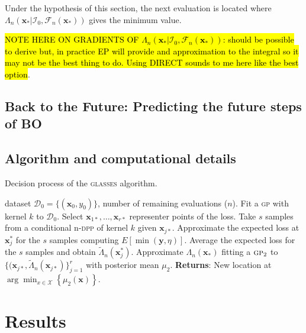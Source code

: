\documentclass[twoside]{article}
\newcommand{\I}{\mathcal{I}}
\newcommand{\bx}{\textbf{x}}
\newcommand{\by}{\textbf{y}}
\newcommand{\future}{\mathcal{F}}
\newcommand{\acr}[1]{\textsc{#1}\xspace}
\newcommand{\gp}{\acr{gp}}
\newcommand{\dpp}{\acr{dpp}}
\newcommand{\us}{\acr{glasses}}
\begin{document}
Under the hypothesis of this section, the next evaluation is located where $\Lambda_n(\bx_*|\I_0, \future_{n}(\bx_*) )$ gives the minimum value. 

\hl{NOTE HERE ON GRADIENTS OF $\Lambda_n(\bx_*|\I_0, \future_{n}(\bx_*) )$: should be possible to derive but, in practice EP will provide and approximation to the integral so it may not be the best thing to do. Using DIRECT sounds to me here like the best option}.

\subsection{Back to the Future: Predicting the future steps of BO}


\subsection{Algorithm and computational details}


\begin{algorithm*}[t!]
   \caption{Decision process of the \us algorithm.}
   \label{alg:glasses}
\begin{algorithmic}
    dataset $\mathcal{D}_{0} = \{(\textbf{x}_0, y_0)\}$, number of remaining evaluations ($n$).
   \STATE Fit a \gp with kernel $k$ to $\mathcal{D}_{0}$.
   \STATE Select $\bx_{1*},\dots,\bx_{r*}$ representer points of the loss.
   \STATE Take $s$ samples from a conditional n-\dpp of kernel $k$ given $\bx_{j*}$.
   \STATE Approximate the expected loss at $\bx_j^*$ for the $s$ samples computing $E [\min (\by,\eta)]$.
  \STATE Average the expected loss for the $s$ samples and obtain $\tilde{\Lambda}_n(\bx_j^*)$.
   \ENDFOR
\STATE Approximate $\Lambda_n(\bx_*)$ fitting a $\gp_2$  to $\{(\bx_{j*}, \tilde{\Lambda}_n(\bx_{j*})\}_{j=1}^r$ with posterior mean $\mu_2$.
   \STATE \textbf{Returns}: New location at $\arg \min_{x \in \mathcal{X}} \left\{\mu_2(\bx)\right\}$.  
\end{algorithmic}
\end{algorithm*}

\section{Results}
\end{document}
